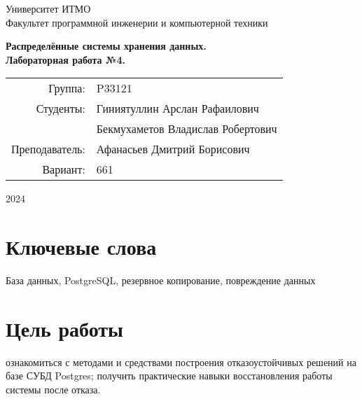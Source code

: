 \documentclass{article}
\begin{document}
\begin{titlepage}
    \begin{center}
        \begin{spacing}{1.4}
            \large{Университет ИТМО} \\
            \large{Факультет программной инженерии и компьютерной техники} \\
        \end{spacing}
        \vfill
        \textbf{
            \huge{Распределённые системы хранения данных.} \\
            \huge{Лабораторная работа №4.} \\
        }
    \end{center}
    \vfill
    \begin{center}
        \begin{tabular}{r l}
            Группа:        & P33121                      \\
            Студенты:       & Гиниятуллин Арслан Рафаилович \\
                            & Бекмухаметов Владислав Робертович   \\
            Преподаватель: & Афанасьев Дмитрий Борисович \\
            Вариант:       & 661 \\
        \end{tabular}
    \end{center}
    \vfill
    \begin{center}
        \begin{large}
            2024
        \end{large}
    \end{center}
\end{titlepage}

\section*{Ключевые слова}

База данных, PostgreSQL, резервное копирование, повреждение данных

\tableofcontents

\section{Цель работы}

ознакомиться с методами и средствами построения отказоустойчивых решений на базе СУБД Postgres; получить практические навыки восстановления работы системы после отказа.
\end{document}
